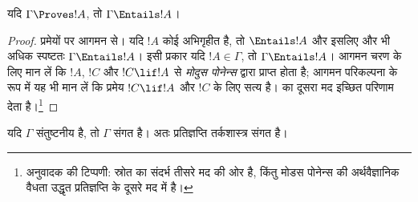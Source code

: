 \documentclass[../../../include/open-logic-section]{subfiles}
\begin{document}


\begin{thm}[निर्दोषता]
यदि $\Gamma\Proves!A$, तो $\Gamma \Entails !A$।
\end{thm}

\begin{proof} 
प्रमेयों पर आगमन से। यदि $!A$ कोई अभिगृहीत है, तो $\Entails !A$ और इसलिए
और भी अधिक स्पष्टतः $\Gamma \Entails!A$। इसी प्रकार यदि $!A \in \Gamma$,
तो $\Gamma \Entails!A$। आगमन चरण के लिए मान लें कि $!A$, $!C$ और
$!C\lif!A$ से \emph{मोदुस पोनेन्स} द्वारा प्राप्त होता है; आगमन परिकल्पना
के रूप में यह भी मान लें कि प्रमेय $!C\lif !A$ और $!C$ के लिए सत्य है।
 का दूसरा मद इच्छित परिणाम देता है।\footnote{अनुवादक की
टिप्पणी: स्रोत का संदर्भ तीसरे मद की ओर है, किंतु मोडस पोनेन्स की अर्थवैज्ञानिक
वैधता उद्धृत प्रतिज्ञप्ति के दूसरे मद में है।}
\end{proof}

\begin{cor} 
यदि $\Gamma$ संतुष्टनीय है, तो $\Gamma$ संगत है। अतः प्रतिज्ञप्ति तर्कशास्त्र
संगत है।
\end{cor}
\end{document}
